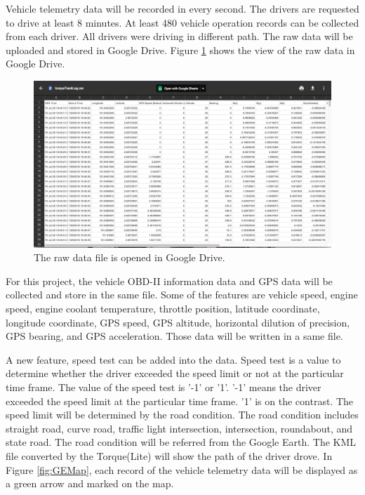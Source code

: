 Vehicle telemetry data will be recorded in every second. The drivers are requested to drive at least 8 minutes. At least 480 vehicle operation records can be collected from each driver. All drivers were driving in different path. The raw data will be uploaded and stored in Google Drive. Figure \ref{fig:GDfile} shows  the view of the raw data in Google Drive.

\begin{figure}[hbt!]\centering
\includegraphics[width=.75\textwidth]{image/GDfile}
\caption{The raw data file is opened in Google Drive.}
\label{fig:GDfile}
\end{figure}

For this project, the vehicle OBD-II information data and GPS data will be collected and store in the same file. Some of the features are vehicle speed, engine speed, engine coolant temperature, throttle position, latitude coordinate, longitude coordinate, GPS speed, GPS altitude, horizontal dilution of precision, GPS bearing, and GPS acceleration. Those data will be written in a same file.

A new feature, speed test can be added into the data. Speed test is a value to determine whether the driver exceeded the speed limit or not at the particular time frame. The value of the speed test is '-1' or '1'. '-1' means the driver exceeded the speed limit at the particular time frame. '1' is on the contrast. The speed limit will be determined by the road condition. The road condition includes straight road, curve road, traffic light intersection, intersection, roundabout, and state road. The road condition will be referred from the Google Earth. The KML file converted by the Torque(Lite) will show the path of the driver drove. In Figure \ref{fig:GEMap}, each record of the vehicle telemetry data will be displayed as a green arrow and marked on the map. 

